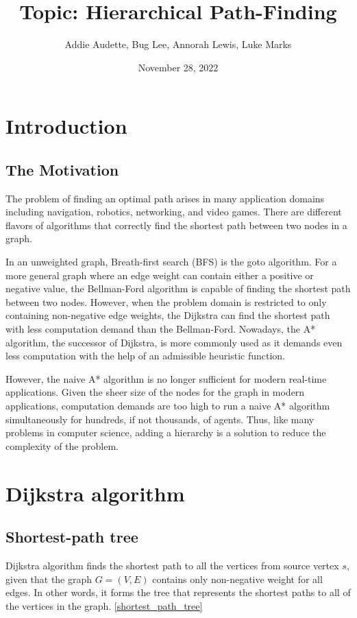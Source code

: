\documentclass{article}
\title{Topic: Hierarchical Path-Finding}
\author{Addie Audette, Bug Lee, Annorah Lewis, Luke Marks}
\date{November 28, 2022}
\begin{document}
\maketitle

\section{Introduction}
\subsection{The Motivation}
The problem of finding an optimal path arises in many application domains including navigation, robotics, networking, and video games. There are different flavors of algorithms that correctly find the shortest path between two nodes in a graph.  

In an unweighted graph, Breath-first search (BFS) is the goto algorithm. For a more general graph where an edge weight can contain either a positive or negative value, the Bellman-Ford algorithm is capable of finding the shortest path between two nodes. However, when the problem domain is restricted to only containing non-negative edge weights, the Dijkstra can find the shortest path with less computation demand than the Bellman-Ford. Nowadays, the A* algorithm, the successor of Dijkstra, is more commonly used as it demands even less computation with the help of an admissible heuristic function. 

However, the naive A* algorithm is no longer sufficient for modern real-time applications. Given the sheer size of the nodes for the graph in modern applications, computation demands are too high to run a naive A* algorithm simultaneously for hundreds, if not thousands, of agents. Thus, like many problems in computer science, adding a hierarchy is a solution to reduce the complexity of the problem.

\section{Dijkstra algorithm}
\subsection{Shortest-path tree}
Dijkstra algorithm finds the shortest path to all the vertices from source vertex $s$, given that the graph $G = (V, E)$ contains only non-negative weight for all edges. In other words, it forms the tree that represents the shortest paths to all of the vertices in the graph. 
\autoref{shortest_path_tree}
\end{document}
